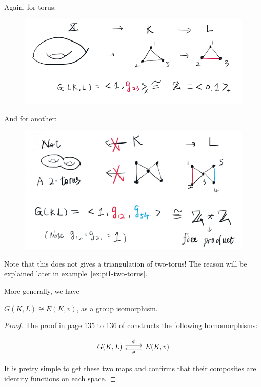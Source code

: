 \begin{ex}
    \label{ex:torus-GLKgroup}
    Again, for torus:
    \begin{figure}[H]
        \centering
        \includegraphics[width=0.9\linewidth]{pics/ch6-notes-3/ex3-L-in-triangle.png}
    \end{figure}
\end{ex}
\begin{ex}
    \label{ex:ex4-L-in-two-torus}
    And for another:
    \begin{figure}[H]
        \centering
        \includegraphics[width=0.9\linewidth]{pics/ch6-notes-3/ex4-L-in-two-torus.png}
    \end{figure}
    Note that this does not gives a triangulation of two-torus! 
    The reason will be explained later in
    example~\ref{ex:pi1-two-torus}.
\end{ex}
More generally, we have
\begin{thm}
    $G(K,L)\cong E(K,v)$, as a group isomorphism.
\end{thm}
\begin{proof}
    The proof in page 135 to 136 of \cite{book} constructs the
    following homomorphisms:

    $$\begin{tikzcd}[]
        G(K,L)\ar[r,"\phi",shift left] & 
            E(K,v)\ar[l,"\theta", shift left]
    \end{tikzcd}$$

    It is pretty simple to get these two maps and confirms that their
    composites are identity functions on each space.
\end{proof}

